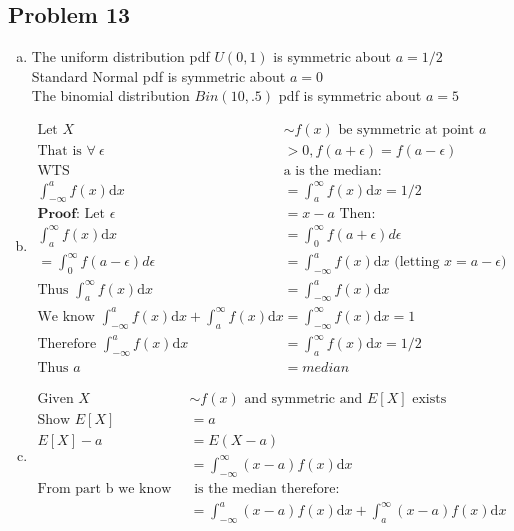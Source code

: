 \documentclass{article}
\newcommand{\dx}{\mathrm{d}x}
\begin{document}
\begin{flushleft}
\section*{Problem 13}
\begin{enumerate}[(a)]
\item
The uniform distribution pdf $U(0,1)$ is symmetric about $a=1/2$\\
Standard Normal pdf is symmetric about $a=0$\\
The binomial distribution $Bin(10,.5)$ pdf is symmetric about $a=5$
\item 
\begin{align*}
\text{Let } X &\sim f(x) \text{ be symmetric at point } a \\
\text{That is } \forall \ \epsilon &>0, f(a+\epsilon)=f(a-\epsilon)\\
\text{WTS } &\text{a is the median:}\\ \int_{-\infty}^{a}f(x)\dx&=\int_{a}^{\infty}f(x)\dx=1/2\\
\textbf{Proof:}\text{ Let } \epsilon&=x-a \text{ Then:}\\
\int_{a}^{\infty}f(x)\dx&=\int_{0}^{\infty}f(a+\epsilon) d\epsilon\\
=\int_{0}^{\infty}f(a-\epsilon)d\epsilon&=\int_{-\infty}^{a}f(x)\dx\text{ (letting } x=a-\epsilon)\\
\text{Thus } \int_{a}^{\infty}f(x)\dx&=\int_{-\infty}^{a}f(x)\dx\\
\text{We know } \int_{-\infty}^{a}f(x)\dx+\int_{a}^{\infty}f(x)\dx&=\int_{-\infty}^{\infty}f(x)\dx=1\\
\text{Therefore } \int_{-\infty}^{a}f(x)\dx&=\int_{a}^{\infty}f(x)\dx=1/2\\
\text{Thus }a&=median
\end{align*}
\item 
\begin{align*}
\text{Given } X&\sim f(x) \text{ and symmetric and } E[X] \text{ exists}\\
\text{Show } E[X]&=a\\
E[X]-a&=E(X-a)\\
&=\int_{-\infty}^{\infty}(x-a)f(x)\dx\\
\text{From part b we know a}&\text{ is the median therefore:}\\
&=\int_{-\infty}^{a}(x-a)f(x)\dx+\int_{a}^{\infty}(x-a)f(x)\dx
\end{align*}
\end{enumerate}
\end{flushleft}
\end{document}
